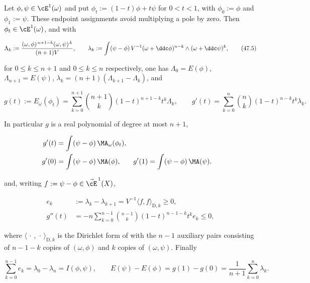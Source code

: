 \begin{theorem}
\label{thm:ch47-segment-expansion}
Let $\phi,\psi\in\cE^1(\omega)$ and put
$\phi_t:=(1-t)\phi+t\psi$ for $0<t<1$, with
$\phi_0:=\phi$ and $\phi_1:=\psi$. These endpoint assignments avoid
multiplying a pole by zero. Then
$\phi_t\in\cE^1(\omega)$, and with

\[
 \Lambda_k:=\frac{(\omega,\phi)^{\,n+1-k}(\omega,\psi)^{\,k}}{(n+1)V},
 \qquad
 \lambda_k:=\int(\psi-\phi)\,
   V^{-1}(\omega+\ddc\phi)^{n-k}\wedge(\omega+\ddc\psi)^{k},
\tag{47.5}\label{eq:ch47-bernstein}
\]

for $0\le k\le n+1$ and $0\le k\le n$ respectively, one has
$\Lambda_0=E(\phi)$, $\Lambda_{n+1}=E(\psi)$,
$\lambda_k=(n+1)(\Lambda_{k+1}-\Lambda_k)$, and

\[
 g(t):=E_\omega(\phi_t)
 =\sum_{k=0}^{n+1}\binom{n+1}{k}(1-t)^{n+1-k}t^k\Lambda_k,
 \qquad
 g'(t)=\sum_{k=0}^{n}\binom{n}{k}(1-t)^{n-k}t^k\lambda_k .
\tag{47.6}\label{eq:ch47-bernstein-derivative}
\]

In particular $g$ is a real polynomial of degree at most $n+1$,

\[
 \begin{aligned}
 g'(t)&=\int(\psi-\phi)\,\MA_\omega(\phi_t),\\
 g'(0)&=\int(\psi-\phi)\,\MA(\phi),&
 g'(1)&=\int(\psi-\phi)\,\MA(\psi).
 \end{aligned}
\]

and, writing $f:=\psi-\phi\in\vec\cE^{\,1}(X)$,

\[
 \begin{aligned}
  e_k&:=\lambda_k-\lambda_{k+1}
    =V^{-1}\langle f,f\rangle_{\mathrm D,k}\ge0,\\
  g''(t)&=-n\sum_{k=0}^{n-1}\binom{n-1}{k}
    (1-t)^{n-1-k}t^ke_k\le0,
 \end{aligned}
\]

where $\langle\,\cdot\,,\,\cdot\,\rangle_{\mathrm D,k}$ is the Dirichlet
form of  with the $n-1$ auxiliary pairs
consisting of $n-1-k$ copies of $(\omega,\phi)$ and $k$ copies of
$(\omega,\psi)$.  Finally

\[
 \sum_{k=0}^{n-1}e_k=\lambda_0-\lambda_n=I(\phi,\psi),
 \qquad
 E(\psi)-E(\phi)=g(1)-g(0)=\frac1{n+1}\sum_{k=0}^{n}\lambda_k .
\]
\end{theorem}

